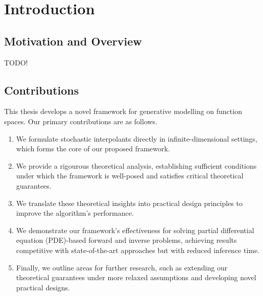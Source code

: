 
\chapter{Introduction} \label{cha:1}  %

\ifpdf
\graphicspath{{Chapter1/Figs/Raster/}{Chapter1/Figs/PDF/}{Chapter1/Figs/}}
\else
\graphicspath{{Chapter1/Figs/Vector/}{Chapter1/Figs/}}
\fi

\section{Motivation and Overview}
TODO!

\section{Contributions}
This thesis develops a novel framework for generative modelling on function spaces. Our primary contributions are as follows.
\begin{enumerate}
  \item We formulate stochastic interpolants directly in infinite-dimensional settings, which forms the core of our proposed framework.
  \item We provide a rigourous theoretical analysis, establishing sufficient conditions under which the framework is well-posed and satisfies critical theoretical guarantees.
  \item We translate these theoretical insights into practical design principles to improve the algorithm's performance.
  \item We demonstrate our framework's effectiveness for solving partial differential equation (PDE)-based forward and inverse problems, achieving results competitive with state-of-the-art approaches but with reduced inference time.
  \item Finally, we outline areas for further research, such as extending our theoretical guarantees under more relaxed assumptions  and developing novel practical designs.
\end{enumerate}


